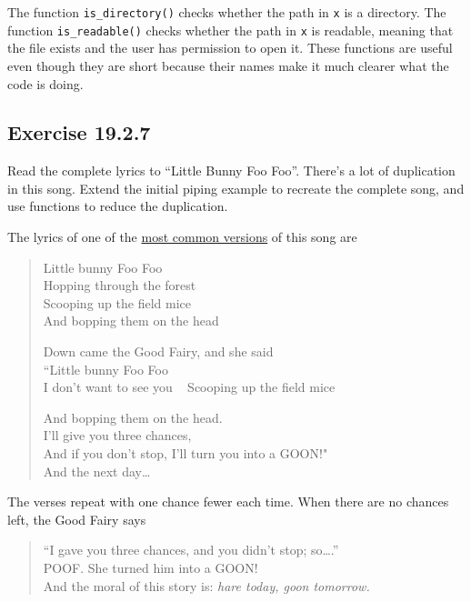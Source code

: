 \documentclass[]{book}
\theoremstyle{plain}
\theoremstyle{remark}
\begin{document}
The function \texttt{is\_directory()} checks whether the path in
\texttt{x} is a directory. The function \texttt{is\_readable()} checks
whether the path in \texttt{x} is readable, meaning that the file exists
and the user has permission to open it. These functions are useful even
though they are short because their names make it much clearer what the
code is doing.

\hypertarget{exercise-19.2.7}{%
\subsection*{\texorpdfstring{Exercise
{19.2.7}}{Exercise 19.2.7}}\label{exercise-19.2.7}}

Read the complete lyrics to ``Little Bunny Foo Foo''. There's a lot of
duplication in this song. Extend the initial piping example to recreate
the complete song, and use functions to reduce the duplication.

The lyrics of one of the
\href{https://en.wikipedia.org/wiki/Little_Bunny_Foo_Foo}{most common
versions} of this song are

\begin{quote}
Little bunny Foo Foo\\
Hopping through the forest\\
Scooping up the field mice\\
And bopping them on the head

Down came the Good Fairy, and she said\\
``Little bunny Foo Foo\\
I don't want to see you ~ Scooping up the field mice

And bopping them on the head.\\
I'll give you three chances,\\
And if you don't stop, I'll turn you into a GOON!"\\
And the next day\ldots{}
\end{quote}

The verses repeat with one chance fewer each time. When there are no
chances left, the Good Fairy says

\begin{quote}
``I gave you three chances, and you didn't stop; so\ldots{}.''\\
POOF. She turned him into a GOON!\\
And the moral of this story is: \emph{hare today, goon tomorrow.}
\end{quote}
\end{document}
